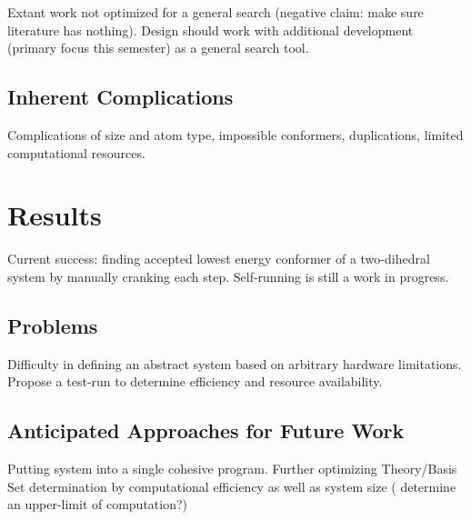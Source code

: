 Extant work not optimized for a general search (negative claim: make sure literature has nothing). 
Design should work with additional development (primary focus this semester) as a general search tool. 


\subsection{Inherent Complications}

Complications of size and atom type, impossible conformers, duplications, limited computational resources.

\section{Results}

Current success: finding accepted lowest energy conformer of a two-dihedral system by manually cranking each step. 
Self-running is still a work in progress.

\subsection{Problems}

Difficulty in defining an abstract system based on arbitrary hardware limitations. Propose a test-run to determine efficiency and resource availability.

\subsection{Anticipated Approaches for Future Work}

Putting system into a single cohesive program. Further optimizing Theory/Basis Set determination by computational efficiency as well as system size ( determine an upper-limit of computation?)